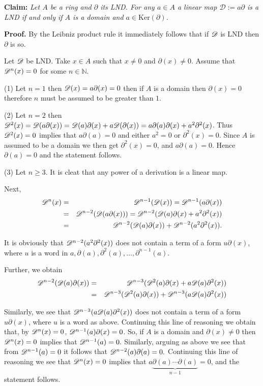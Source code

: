 \maketitle

\textbf{Claim:} \textit{Let $A$ be a ring and $\partial$ its LND. For any $a\in A$ a linear map $\mathscr{D}:=a\partial$ is a LND if and only if $A$ is a domain and $a \in \mathrm{Ker}(\partial)$}.

\textbf{Proof.}
By the Leibniz product rule it immediately follows that if $\mathscr{D}$ is LND then $\partial$ is so.

Let $\mathscr{D}$ be LND. Take $x \in A$ such that $x \ne 0$ and $\partial(x) \ne 0$. Assume that $\mathscr{D}^n(x) = 0$ for some $n \in \mathbb{N}$.

(1) Let $n=1$ then $\mathscr{D}(x) = a\partial(x) =0$ then if $A$ is a domain then $\partial(x) = 0$ therefore $n$ must be assumed to be greater than $1$.

(2) Let $n=2$ then $\mathscr{D}^2(x) = \mathscr{D}(a\partial(x))= \mathscr{D}(a)\partial(x)+ a\mathscr{D}(\partial(x)) = a\partial(a)\partial(x) + a^2\partial^2(x)$. Thus $\mathscr{D}^2(x)=0$ implies that $a\partial(a)=0$ and either $a^2=0$ or $\partial^2(x)=0$. Since $A$ is assumed to be a domain we then get $\partial^2(x)=0$, and $a\partial(a)=0$. Hence $\partial(a) = 0$ and the statement follows.

(3) Let $n\ge 3.$ It is cleat that any power of a derivation is a linear map.

Next,
\begin{eqnarray*}
 \mathscr{D}^n(x) &=& \mathscr{D}^{n-1}(\mathscr{D}(x)) = \mathscr{D}^{n-1}(a\partial(x))\\
  &=& \mathscr{D}^{n-2}(\mathscr{D}(a\partial(x))) = \mathscr{D}^{n-2}(\mathscr{D}(a)\partial(x) + a^2\partial^2(x)) \\
  &=& \mathscr{D}^{n-2}(\mathscr{D}(a)\partial(x)) + \mathscr{D}^{n-2}(a^2\partial^2(x)).
\end{eqnarray*}

It is obviously that $\mathscr{D}^{n-2}(a^2\partial^2(x))$ does not contain a term of a form $u\partial(x)$, where $u$ is a word in $a,\partial(a),\partial^2(a),\ldots, \partial^{n-1}(a)$.

Further, we obtain
\begin{eqnarray*}
 \mathscr{D}^{n-2}(\mathscr{D}(a)\partial(x)) &=& \mathscr{D}^{n-3}(\mathscr{D}^2(a)\partial(x) + a\mathscr{D}(a)\partial^2(x)) \\
 &=& \mathscr{D}^{n-3}(\mathscr{D}^2(a)\partial(x)) + \mathscr{D}^{n-3}(a\mathscr{D}(a)\partial^2(x))
\end{eqnarray*}

Similarly, we see that $\mathscr{D}^{n-3}(a\mathscr{D}(a)\partial^2(x))$ does not contain a term of a form $u\partial(x)$, where $u$ is a word as above. Continuing this line of reasoning we obtain that, by $\mathscr{D}^n(x)=0$, $\mathscr{D}^{n-1}(a)\partial(x) =0$. So, if $A$ is a domain and $\partial(x) \ne 0$ then $\mathscr{D}^n(x) =0$ implies that $\mathscr{D}^{n-1}(a)=0.$ Similarly, arguing as above we see that from $\mathscr{D}^{n-1}(a)=0$ it follows that $\mathscr{D}^{n-2}(a)\partial(a)=0.$ Continuing this line of reasoning we see that $\mathscr{D}^n(x) = 0$ implies that $a \underbrace{\partial(a) \cdots \partial(a)}_{n-1}=0$, and the statement follows.





